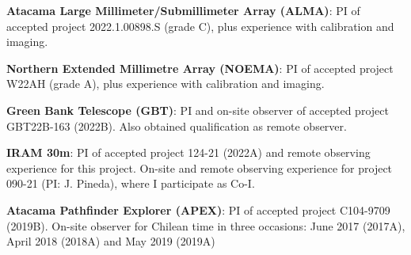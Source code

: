 \vspace{8pt}

\begin{cvparagraph}
	
\textbf{Atacama Large Millimeter/Submillimeter Array (ALMA)}: %
{PI of accepted project 2022.1.00898.S (grade C), plus experience with calibration and imaging.} %

\textbf{Northern Extended Millimetre Array (NOEMA)}: %
{PI of accepted project W22AH (grade A), plus experience with calibration and imaging.} %
	
\textbf{Green Bank Telescope (GBT)}: %
{PI and on-site observer of accepted project GBT22B-163 (2022B). Also obtained qualification as remote observer.} 

\textbf{IRAM 30m}: %
{PI of accepted project 124-21 (2022A) and remote observing experience for this project. On-site and remote observing experience for project 090-21 (PI: J. Pineda), where I participate as Co-I.} %

\textbf{Atacama Pathfinder Explorer (APEX)}: %
{PI of accepted project C104-9709 (2019B). On-site observer for Chilean time in three occasions: June 2017 (2017A), April 2018 (2018A) and May 2019 (2019A)} 

\end{cvparagraph}

%
%	
%	
%
%	
%	

